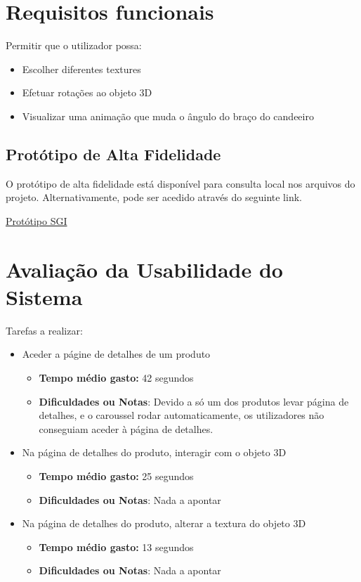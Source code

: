 \documentclass[a4paper,12pt]{article}
\begin{document}
\newpage
\section{Requisitos funcionais}
Permitir que o utilizador possa:
\begin{itemize}
    \item Escolher diferentes textures
    \item Efetuar rotações ao objeto 3D
    \item Visualizar uma animação que muda o ângulo do braço do candeeiro
\end{itemize}

\subsection*{Protótipo de Alta Fidelidade}
O protótipo de alta fidelidade está disponível para consulta local nos arquivos do projeto.
Alternativamente, pode ser acedido através do seguinte link.
\begin{center}
    \textcolor{linkblue}{\href{https://www.figma.com/design/TEG313SKH9fQoVAzpbTVPL/SGI_Project}{Protótipo SGI}}
\end{center}

\newpage
\section{Avaliação da Usabilidade do Sistema}

Tarefas a realizar:
\begin{itemize}
    \item Aceder a págine de detalhes de um produto
          \begin{itemize}
              \item \textbf{Tempo médio gasto:} 42 segundos
              \item \textbf{Dificuldades ou Notas}: Devido a só um dos produtos levar página de detalhes, e o caroussel rodar automaticamente, os utilizadores não conseguiam aceder à página de detalhes.
          \end{itemize}
    \item Na página de detalhes do produto, interagir com o objeto 3D
          \begin{itemize}
              \item \textbf{Tempo médio gasto:} 25 segundos
              \item \textbf{Dificuldades ou Notas}: Nada a apontar
          \end{itemize}
    \item Na página de detalhes do produto, alterar a textura do objeto 3D
          \begin{itemize}
              \item \textbf{Tempo médio gasto:} 13 segundos
              \item \textbf{Dificuldades ou Notas}: Nada a apontar
          \end{itemize}
\end{itemize}
\end{document}
